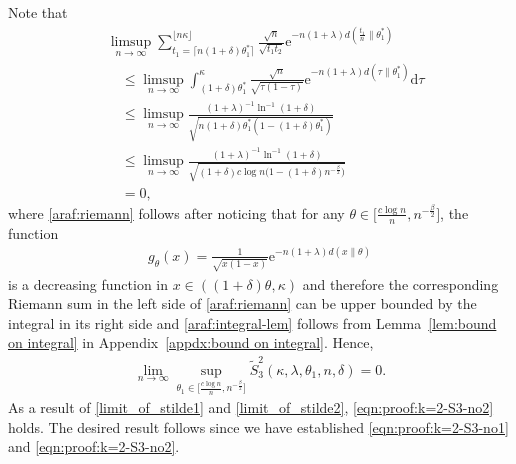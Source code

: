 \documentclass[journal, 10pt]{IEEEtran}
\newcommand{\rmd}{\mathrm{d}}
\newcommand{\rme}{\mathrm{e}}
\theoremstyle{plain}
\theoremstyle{plain}
\theoremstyle{plain}
\theoremstyle{plain}
\begin{document}
\begin{appendices}
\begin{IEEEproof}
Note that 
\begin{align}
	&\limsup_{n\to \infty}   \sum_{t_1=\lceil n(1+\delta)\theta_1^\ast \rceil }^{\lfloor n\kappa \rfloor } 
\frac{\sqrt{n} }{\sqrt{t_1t_2}} \rme^{-n(1+\lambda) d\left(\frac{t_1}{n}\|\theta_1^\ast\right)} \nonumber \\  
&\quad \le \limsup_{n\to \infty}  	\int_{(1+\delta)\theta_1^\ast}^{\kappa } \frac{\sqrt{n}}{\sqrt{\tau(1-\tau)}}\rme^{-n(1+\lambda)d(\tau\|\theta_1^\ast)}\rmd \tau \label{araf:riemann} \\
&\quad \le  \limsup_{n\to \infty}  \frac{(1+\lambda)^{-1}\ln^{-1}(1+\delta)}{\sqrt{n(1+\delta)\theta_1^\ast(1-(1+\delta)\theta_1^\ast)} } \label{araf:integral-lem} \\
&\quad \le  \limsup_{n\to \infty}   \frac{(1+\lambda)^{-1} \ln^{-1}(1+\delta)}{\sqrt{(1+\delta)c\log n \big(1-(1+\delta) n^{-\frac{\beta}{2}} \big)} } \\ 
&\quad = 0\text{,}
\end{align} 
where \eqref{araf:riemann} follows after noticing that for any $\theta\in \big[\frac{c\log n}{n} , n^{-\frac{\beta}{2}} \big]$, the function
\begin{align}
	g_\theta(x)=\frac{1}{\sqrt{x(1-x)}}\rme^{-n(1+\lambda)d(x\| \theta) }
\end{align}
is a decreasing function in $x\in ((1+\delta)\theta,\kappa)  $ and therefore the corresponding Riemann sum in the left side  of \eqref{araf:riemann} can be upper bounded by the integral in its right side and \eqref{araf:integral-lem} follows from Lemma~\ref{lem:bound on integral} in Appendix~\ref{appdx:bound on integral}. Hence, 
\begin{align}
	\lim_{n\to \infty} \sup_{\theta_1 \in \big[ \frac{c\log n}{n} , n^{-\frac{\beta}{2}} \big] }\widetilde{S}_3^2(\kappa, \lambda, \theta_1, n, \delta) = 0\text{.} \label{limit_of_stilde2}
\end{align}
As a result of \eqref{limit_of_stilde1} and \eqref{limit_of_stilde2}, \eqref{eqn:proof:k=2-S3-no2} holds. The desired result follows since we have established \eqref{eqn:proof:k=2-S3-no1} and \eqref{eqn:proof:k=2-S3-no2}.

\end{IEEEproof} 

\end{appendices}
\end{document}
